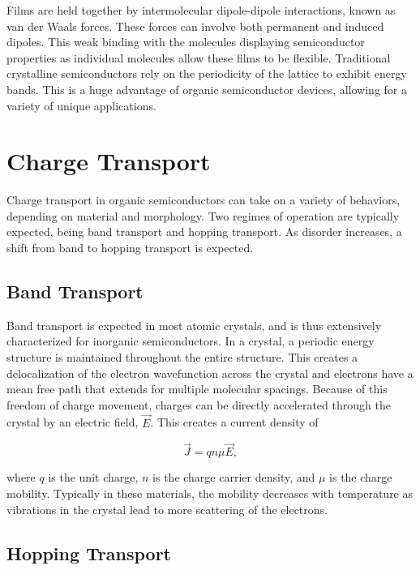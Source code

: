 \documentclass[../thesis.tex]{subfiles}
\begin{document}
Films are held together by intermolecular dipole-dipole interactions, known as van der Waals forces.
These forces can involve both permanent and induced dipoles.
This weak binding with the molecules displaying semiconductor properties as individual molecules allow these films to be flexible.
Traditional crystalline semiconductors rely on the periodicity of the lattice to exhibit energy bands.  
This is a huge advantage of organic semiconductor devices, allowing for a variety of unique applications.

\section{Charge Transport}

Charge transport in organic semiconductors can take on a variety of behaviors, depending on material and morphology.\supercite{Pope1999,Mark1962}
Two regimes of operation are typically expected, being band transport and hopping transport.  
As disorder increases, a shift from band to hopping transport is expected.

\subsection{Band Transport}

Band transport is expected in most atomic crystals, and is thus extensively characterized for inorganic semiconductors.\supercite{Kasap1997}
In a crystal, a periodic energy structure is maintained throughout the entire structure.
This creates a delocalization of the electron wavefunction across the crystal and electrons have a mean free path that extends for multiple molecular spacings.
Because of this freedom of charge movement, charges can be directly accelerated through the crystal by an electric field, $\vec{E}$.
This creates a current density of 

\begin{equation}
\vec{J}=qn\mu \vec{E},
\end{equation}

where $q$ is the unit charge, $n$ is the charge carrier density, and $\mu$ is the charge mobility.
Typically in these materials, the mobility decreases with temperature as vibrations in the crystal lead to more scattering of the electrons.


\subsection{Hopping Transport}
\end{document}
